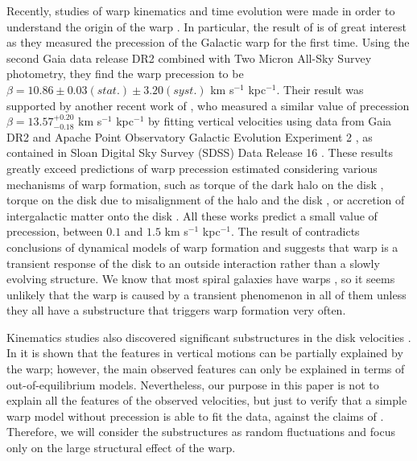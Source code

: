 \documentclass[twocolumn]{aastex63}
\begin{document}
Recently, studies of warp kinematics and time evolution were made in order to understand the origin of the warp \citep{poggio_kin,poggio,haifeng}. In particular, the result of \citet[hereafter P20]{poggio} is of great interest as they measured the precession of the Galactic warp for the first time. Using the second Gaia data release DR2 \citep{gaia1,gaia} combined with Two Micron All-Sky Survey \citep[2MASS]{2mass} photometry, they find the warp precession to be $\beta=10.86 \pm 0.03 (stat.) \pm 3.20 (syst.)$ km s$^{-1}$ kpc$^{-1}$. Their result was supported by another recent work of \cite{cheng}, who measured a similar value of precession $\beta=13.57^{+0.20}_{-0.18}$ km s$^{-1}$ kpc$^{-1}$ by fitting vertical velocities using data from Gaia DR2 and Apache Point Observatory Galactic Evolution Experiment 2 \citep[APOGEE-2]{majewski}, as contained in Sloan Digital Sky Survey (SDSS) Data Release 16 \citep[DR16]{apogee}. These results greatly exceed predictions of warp precession estimated considering various mechanisms of warp formation, such as torque of the dark halo on the disk \citep{dubinski}, torque on the disk due to misalignment of the halo and the disk \citep{jiang}, or accretion of intergalactic matter onto the disk \citep{martin_accretion,jeon}. All these works predict a small value of precession, between $0.1$ and $1.5$ km s$^{-1}$ kpc$^{-1}$. The result of  contradicts conclusions of dynamical models of warp formation and suggests that warp is a transient response of the disk to an outside interaction rather than a slowly evolving structure. We know that most spiral galaxies have warps \citep{reshetnikov,sanchez}, so it seems unlikely that the warp is caused by a transient phenomenon in all of them unless they all have a substructure that triggers warp formation very often.

Kinematics studies also discovered significant substructures in the disk velocities \citep{haifeng_maps,martin_new,xu}. In \cite{martin_new} it is shown that the features in vertical motions can be partially explained by the warp; however, the main observed features can only be explained in terms of out-of-equilibrium models. Nevertheless, our purpose in this paper is not to explain all the features of the observed velocities, but just to verify that a simple warp model without precession is able to fit the data, against the claims of . Therefore, we will consider the substructures as random fluctuations and focus only on the large structural effect of the warp.
\end{document}
